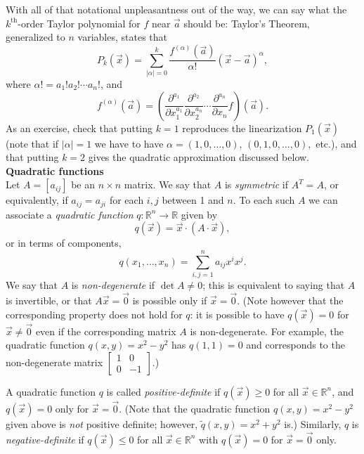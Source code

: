 With all of that notational unpleasantness out of the way, we can say what the $k^{\textrm{th}}$-order Taylor polynomial for $f$ near $\vec{a}$ should be: Taylor's Theorem, generalized to $n$ variables, states that  
\[
 P_k(\vec{x}) = \sum_{\lvert\alpha\rvert=0}^k \frac{f^{(\alpha)}(\vec{a})}{\alpha!}(\vec{x}-\vec{a})^\alpha,
\]
where $\alpha! = a_1!a_2!\cdots a_n!$, and 
\[
f^{(\alpha)}(\vec{a}) = \left(\frac{\partial^{a_1}}{\partial x_1^{a_1}}\frac{\partial^{a_2}}{\partial x_2^{a_n}}\cdots\frac{\partial^{a_n}}{\partial x_n}f\right)(\vec{a}). 
\]
As an exercise, check that putting $k=1$ reproduces the linearization $P_1(\vec{x})$ (note that if $\lvert\alpha\rvert=1$ we have to have $\alpha = (1,0,\ldots, 0),\, (0,1,0,\ldots, 0),$ etc.), and that putting $k=2$ gives the quadratic approximation discussed below.\\

\noindent\textbf{Quadratic functions}\\

Let $A=[a_{ij}]$ be an $n\times n$ matrix. We say that $A$ is {\em symmetric} if $A^T=A$, or equivalently, if $a_{ij} = a_{ji}$ for each $i,j$ between 1 and $n$. To each such $A$ we can associate a {\em quadratic function} $q:\mathbb{R}^n\to \mathbb{R}$ given by
\[
q(\vec{x}) = \vec{x}\cdot (A\cdot \vec{x}),
\]
or in terms of components,
\[
q(x_1,\ldots, x_n) = \sum_{i,j=1}^n a_{ij}x^ix^j.
\]
We say that $A$ is {\em non-degenerate} if $\det A\neq 0$; this is equivalent to saying that $A$ is invertible, or that $A\vec{x}=\vec{0}$ is possible only if $\vec{x}=\vec{0}$. (Note however that the corresponding property does not hold for $q$: it is possible to have $q(\vec{x})=0$ for $\vec{x}\neq \vec{0}$ even if the corresponding matrix $A$ is non-degenerate. For example, the quadratic function $q(x,y)=x^2-y^2$ has $q(1,1)=0$ and corresponds to the non-degenerate matrix $\begin{bmatrix}1&0\\0&-1\end{bmatrix}$.)

A quadratic function $q$ is called {\em positive-definite} if $q(\vec{x})\geq 0$ for all $\vec{x}\in\mathbb{R}^n$, and $q(\vec{x})=0$ only for $\vec{x}=\vec{0}$. (Note that the quadratic function $q(x,y)=x^2-y^2$ given above is {\em not} positive definite; however, $\tilde{q}(x,y) = x^2+y^2$ is.) Similarly, $q$ is {\em negative-definite} if $q(\vec{x})\leq 0$ for all $\vec{x}\in\mathbb{R}^n$ with $q(\vec{x})=0$ for $\vec{x}=\vec{0}$ only.

